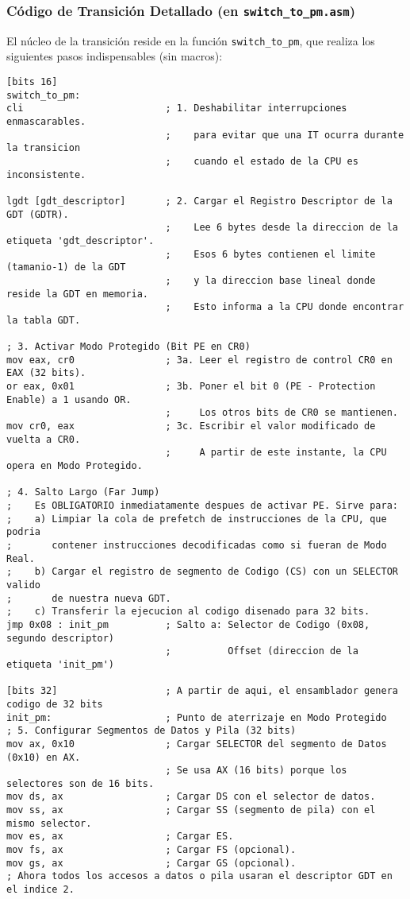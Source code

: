 \subsubsection{Código de Transición Detallado (en \texttt{switch\_to\_pm.asm})}

El núcleo de la transición reside en la función \texttt{switch\_to\_pm}, que realiza los siguientes pasos indispensables (sin macros):

\begin{lstlisting}[style=NasmStyle, breaklines=true,
    caption={\texttt{switch\_to\_pm.asm} (Nucleo de la transicion)}]
[bits 16]
switch_to_pm:
cli                         ; 1. Deshabilitar interrupciones enmascarables.
                            ;    para evitar que una IT ocurra durante la transicion
                            ;    cuando el estado de la CPU es inconsistente.

lgdt [gdt_descriptor]       ; 2. Cargar el Registro Descriptor de la GDT (GDTR).
                            ;    Lee 6 bytes desde la direccion de la etiqueta 'gdt_descriptor'.
                            ;    Esos 6 bytes contienen el limite (tamanio-1) de la GDT
                            ;    y la direccion base lineal donde reside la GDT en memoria.
                            ;    Esto informa a la CPU donde encontrar la tabla GDT.

; 3. Activar Modo Protegido (Bit PE en CR0)
mov eax, cr0                ; 3a. Leer el registro de control CR0 en EAX (32 bits).
or eax, 0x01                ; 3b. Poner el bit 0 (PE - Protection Enable) a 1 usando OR.
                            ;     Los otros bits de CR0 se mantienen.
mov cr0, eax                ; 3c. Escribir el valor modificado de vuelta a CR0.
                            ;     A partir de este instante, la CPU opera en Modo Protegido.

; 4. Salto Largo (Far Jump)
;    Es OBLIGATORIO inmediatamente despues de activar PE. Sirve para:
;    a) Limpiar la cola de prefetch de instrucciones de la CPU, que podria
;       contener instrucciones decodificadas como si fueran de Modo Real.
;    b) Cargar el registro de segmento de Codigo (CS) con un SELECTOR valido
;       de nuestra nueva GDT.
;    c) Transferir la ejecucion al codigo disenado para 32 bits.
jmp 0x08 : init_pm          ; Salto a: Selector de Codigo (0x08, segundo descriptor)
                            ;          Offset (direccion de la etiqueta 'init_pm')

[bits 32]                   ; A partir de aqui, el ensamblador genera codigo de 32 bits
init_pm:                    ; Punto de aterrizaje en Modo Protegido
; 5. Configurar Segmentos de Datos y Pila (32 bits)
mov ax, 0x10                ; Cargar SELECTOR del segmento de Datos (0x10) en AX.
                            ; Se usa AX (16 bits) porque los selectores son de 16 bits.
mov ds, ax                  ; Cargar DS con el selector de datos.
mov ss, ax                  ; Cargar SS (segmento de pila) con el mismo selector.
mov es, ax                  ; Cargar ES.
mov fs, ax                  ; Cargar FS (opcional).
mov gs, ax                  ; Cargar GS (opcional).
; Ahora todos los accesos a datos o pila usaran el descriptor GDT en el indice 2.


\end{lstlisting}
